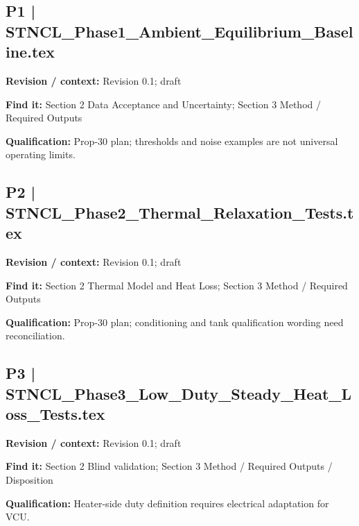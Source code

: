 \documentclass[11pt]{article}
\begin{document}
\begin{minipage}{\textwidth}\small
\subsection*{P1 | STNCL\_\allowbreak{}Phase1\_\allowbreak{}Ambient\_\allowbreak{}Equilibrium\_\allowbreak{}Baseline.tex}
\textbf{Revision / context:} Revision 0.1; draft\par
\textbf{Find it:} Section 2 Data Acceptance and Uncertainty; Section 3 Method / Required Outputs\par
\textbf{Qualification:} Prop-30 plan; thresholds and noise examples are not universal operating limits.\par
\end{minipage}\par\vspace{5pt}
\par
\begin{minipage}{\textwidth}\small
\subsection*{P2 | STNCL\_\allowbreak{}Phase2\_\allowbreak{}Thermal\_\allowbreak{}Relaxation\_\allowbreak{}Tests.tex}
\textbf{Revision / context:} Revision 0.1; draft\par
\textbf{Find it:} Section 2 Thermal Model and Heat Loss; Section 3 Method / Required Outputs\par
\textbf{Qualification:} Prop-30 plan; conditioning and tank qualification wording need reconciliation.\par
\end{minipage}\par\vspace{5pt}
\begin{minipage}{\textwidth}\small
\subsection*{P3 | STNCL\_\allowbreak{}Phase3\_\allowbreak{}Low\_\allowbreak{}Duty\_\allowbreak{}Steady\_\allowbreak{}Heat\_\allowbreak{}Loss\_\allowbreak{}Tests.tex}
\textbf{Revision / context:} Revision 0.1; draft\par
\textbf{Find it:} Section 2 Blind validation; Section 3 Method / Required Outputs / Disposition\par
\textbf{Qualification:} Heater-side duty definition requires electrical adaptation for VCU.\par
\end{minipage}\par\vspace{5pt}
\end{document}
